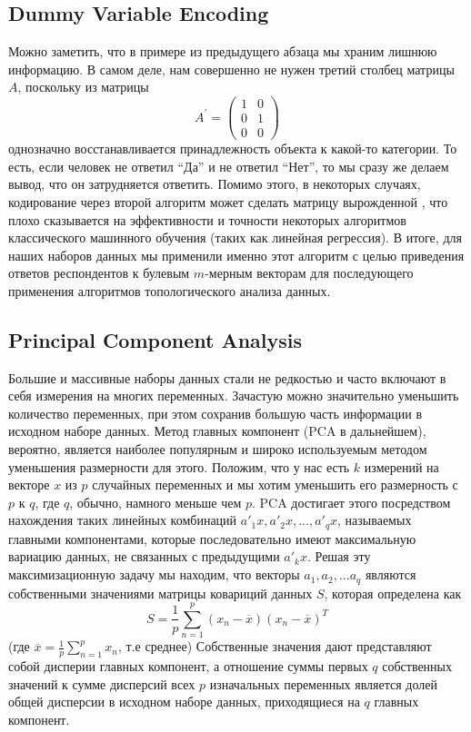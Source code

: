 \subsection{Dummy Variable Encoding}

Можно заметить, что в примере из предыдущего абзаца мы храним лишнюю информацию.
В самом деле, нам совершенно не нужен третий столбец матрицы $A$, поскольку из матрицы
\[
    A^{\prime} = \begin{pmatrix}
        1 & 0 \\
        0 & 1 \\
        0 & 0
    \end{pmatrix}
\]
однозначно восстанавливается принадлежность объекта к какой-то категории.
То есть, если человек не ответил \enquote{Да} и не ответил \enquote{Нет}, то мы сразу же делаем вывод, что он затрудняется ответить.
Помимо этого, в некоторых случаях, кодирование через второй алгоритм может сделать матрицу вырожденной \cite{feature-eng-sel}, что плохо сказывается на эффективности и точности некоторых алгоритмов классического машинного обучения (таких как линейная регрессия).
В итоге, для наших наборов данных мы применили именно этот алгоритм с целью приведения ответов респондентов к булевым $m$-мерным векторам для последующего применения алгоритмов топологического анализа данных.
\subsection{Principal Component Analysis}

Большие и массивные наборы данных стали не редкостью и часто включают в себя измерения на многих переменных. 
Зачастую можно значительно уменьшить количество переменных, при этом сохранив большую часть информации в исходном наборе данных. 
Метод  главных компонент (PCA в дальнейшем), вероятно, является наиболее популярным и широко используемым методом уменьшения размерности для этого. 
Положим, что у нас есть $k$ измерений на векторе $x$ из $p$ случайных переменных и мы хотим уменьшить его размерность с $p$ к $q$, где $q$, обычно, намного меньше чем $p$. 
PCA достигает этого посредством нахождения таких линейных комбинаций $a'_1x, a'_2x, ..., a'_qx$, называемых главными компонентами, которые последовательно имеют максимальную вариацию данных, не связанных с предыдущими $a'_kx$. Решая эту максимизационную задачу мы находим, что векторы $a_1, a_2, ... a_q$ являются собственными значениями матрицы ковариций данных $S$, которая определена как 
    $$S = \frac{1}{p} \sum_{n = 1}^p(x_n - \overline{x})(x_n - \overline{x})^T$$
(где $\overline{x} = \frac{1}{p}\sum_{n = 1}^p x_n$, т.е среднее)
Собственные значения дают представляют собой дисперии главных компонент, а отношение суммы первых $q$ собственных значений к сумме дисперсий всех $p$ изначальных переменных является долей общей дисперсии в исходном наборе данных, приходящиеся на $q$ главных компонент. \\

